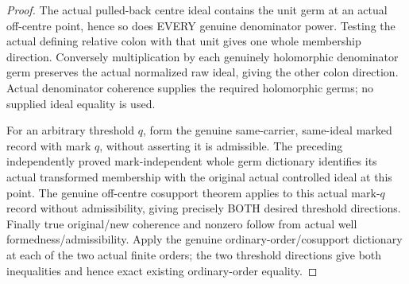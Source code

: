 \begin{proof}
The actual pulled-back centre ideal contains the unit germ at an actual
off-centre point, hence so does EVERY genuine denominator power. Testing
the actual defining relative colon with that unit gives one whole
membership direction. Conversely multiplication by each genuinely
holomorphic denominator germ preserves the actual normalized raw ideal,
giving the other colon direction. Actual denominator coherence supplies
the required holomorphic germs; no supplied ideal equality is used.

For an arbitrary threshold $q$, form the genuine same-carrier, same-ideal
marked record with mark $q$, without asserting it is admissible. The
preceding independently proved mark-independent whole germ dictionary
identifies its actual transformed membership with the original actual
controlled ideal at this point. The genuine off-centre cosupport theorem
applies to this actual mark-$q$ record without admissibility, giving
precisely BOTH desired threshold directions. Finally true original/new
coherence and nonzero follow from actual well formedness/admissibility.
Apply the genuine ordinary-order/cosupport dictionary at each of the two
actual finite orders; the two threshold directions give both inequalities
and hence exact existing ordinary-order equality.
\end{proof}

